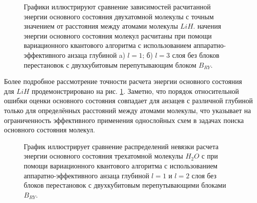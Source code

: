 \documentclass[14pt]{extarticle}
\begin{document}
\begin{figure}[H]
\begin{minipage}[H]{0.48\linewidth}
\end{minipage}
\caption{Графики иллюстрируют сравнение зависимостей расчитанной энергии основного состояния двухатомной молекулы с точным значением от расстояния между атомами молекулы $LiH$. начения энергии основного состояния молекул расчитаны при помощи вариационного квантового алгоритма с использованием аппаратно-эффективного анзаца глубиной a) $l = 1$; б) $l = 3$ слоя без блоков перестановок с двухкубитовым перепутывающим блоком $B_{RY}$.}\label{fig:2atom_errs}
\end{figure}


\qquad Более подробное рассмотрение точности расчета энергии основного состояния для $LiH$ продемонстрировано на рис. \ref{fig:2atom_errs}. Заметно, что порядок относительной ошибки оценки основного состояния совпадает для анзацев с различной глубиной только для определённых расстояний между атомами молекулы, что указывает на ограниченность эффективного применения однослойных схем в задачах поиска основного состояния молекул.

\begin{figure}[H]
\begin{minipage}[H]{1.\linewidth}
\end{minipage}
\caption{График иллюстрирует сравнение распределений невязки расчета энергии основного состояния трехатомной молекулы $H_2O$ с при помощи вариационного квантового алгоритма с использованием аппаратно-эффективного анзаца глубиной $l = 1$ и $l = 2$ слоя без блоков перестановок с двухкубитовым перепутывающими блоками $B_{RY}$.}\label{fig:3atom_errs}
\end{figure}
\end{document}
